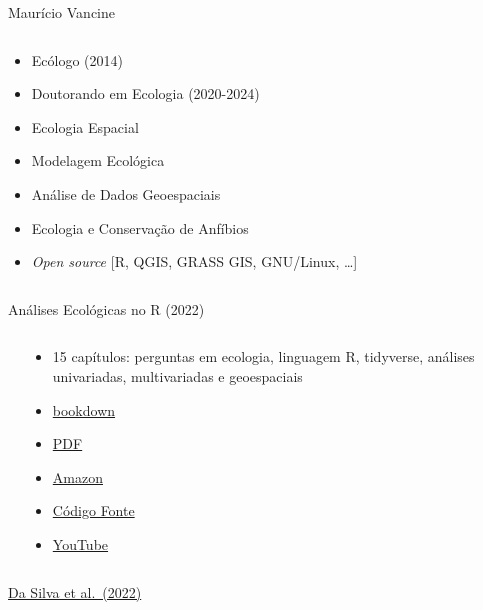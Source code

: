 \documentclass[
  ignorenonframetext,
]{beamer}
\begin{document}
\begin{frame}
\begin{block}{Maurício Vancine}
\begin{columns}[T]
\begin{column}{0.6\textwidth}
\begin{itemize}
\item
  Ecólogo (2014)
\item
  Doutorando em Ecologia (2020-2024)
\item
  Ecologia Espacial
\item
  Modelagem Ecológica
\item
  Análise de Dados Geoespaciais
\item
  Ecologia e Conservação de Anfíbios
\item
  \emph{Open source} {[}R, QGIS, GRASS GIS, GNU/Linux, \ldots{]}
\end{itemize}
\end{column}
\end{columns}
\end{block}

\begin{block}{Análises Ecológicas no R (2022)}
\protect\hypertarget{anuxe1lises-ecoluxf3gicas-no-r-2022}{}
\begin{columns}[T]
\begin{column}{0.4\textwidth}
\end{column}

\begin{column}{0.6\textwidth}
\begin{itemize}
\item
  15 capítulos: perguntas em ecologia, linguagem R, tidyverse, análises
  univariadas, multivariadas e geoespaciais
\item
  \href{https://analises-ecologicas.com/}{bookdown}
\item
  \href{https://canal6.com.br/livreacesso/livro/analises-ecologicas-no-r/}{PDF}
\item
  \href{https://www.amazon.com.br/An\%C3\%A1lises-ecol\%C3\%B3gicas-Ferdo-Rodrigues-Silva/dp/857917564X/ref=sr_1_1?keywords=9788579175640\&qid=1654379366\&sr=8-1}{Amazon}
\item
  \href{https://github.com/paternogbc/livro_aer}{Código Fonte}
\item
  \href{https://www.youtube.com/channel/UCLSVSCnmvf2k6OoWZCnEO4w}{YouTube}
\end{itemize}
\end{column}
\end{columns}

\href{https://analises-ecologicas.com/}{Da Silva et al.~(2022)}
\end{block}


\end{frame}
\end{document}
